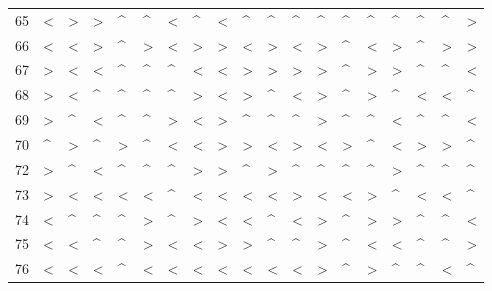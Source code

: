 \begin{tabular}{lllllllllllllllllll}
65  &  < &  > &  > &  \textasciicircum  &  \textasciicircum  &  < &  \textasciicircum  &  < &  \textasciicircum  &  \textasciicircum  &  \textasciicircum  &  \textasciicircum  &  \textasciicircum  &  \textasciicircum  &  \textasciicircum  &  \textasciicircum  &  \textasciicircum  &  > \\
66  &  < &  < &  > &  \textasciicircum  &  > &  < &  > &  > &  < &  > &  < &  > &  \textasciicircum  &  < &  > &  \textasciicircum  &  > &  > \\
67  &  > &  < &  < &  \textasciicircum  &  \textasciicircum  &  \textasciicircum  &  < &  < &  > &  > &  > &  > &  \textasciicircum  &  > &  > &  \textasciicircum  &  \textasciicircum  &  < \\
68  &  > &  < &  \textasciicircum  &  \textasciicircum  &  \textasciicircum  &  \textasciicircum  &  > &  < &  > &  \textasciicircum  &  < &  > &  \textasciicircum  &  > &  \textasciicircum  &  < &  < &  \textasciicircum  \\
69  &  > &  \textasciicircum  &  < &  \textasciicircum  &  \textasciicircum  &  > &  < &  > &  \textasciicircum  &  \textasciicircum  &  \textasciicircum  &  > &  \textasciicircum  &  \textasciicircum  &  < &  \textasciicircum  &  \textasciicircum  &  < \\
70  &  \textasciicircum  &  > &  \textasciicircum  &  > &  \textasciicircum  &  < &  < &  > &  > &  < &  > &  < &  > &  \textasciicircum  &  < &  > &  > &  \textasciicircum  \\
72  &  > &  \textasciicircum  &  < &  \textasciicircum  &  \textasciicircum  &  \textasciicircum  &  > &  > &  \textasciicircum  &  > &  \textasciicircum  &  \textasciicircum  &  \textasciicircum  &  \textasciicircum  &  > &  \textasciicircum  &  \textasciicircum  &  \textasciicircum  \\
73  &  > &  < &  < &  < &  < &  \textasciicircum  &  < &  < &  < &  < &  > &  < &  < &  > &  \textasciicircum  &  < &  < &  \textasciicircum  \\
74  &  < &  \textasciicircum  &  \textasciicircum  &  \textasciicircum  &  > &  \textasciicircum  &  > &  < &  < &  \textasciicircum  &  < &  > &  \textasciicircum  &  > &  > &  \textasciicircum  &  \textasciicircum  &  < \\
75  &  < &  < &  \textasciicircum  &  \textasciicircum  &  > &  < &  < &  > &  > &  \textasciicircum  &  \textasciicircum  &  > &  \textasciicircum  &  < &  < &  \textasciicircum  &  \textasciicircum  &  > \\
76  &  < &  < &  < &  \textasciicircum  &  < &  < &  < &  < &  < &  < &  < &  > &  \textasciicircum  &  > &  \textasciicircum  &  \textasciicircum  &  < &  \textasciicircum  \\

\end{tabular}
